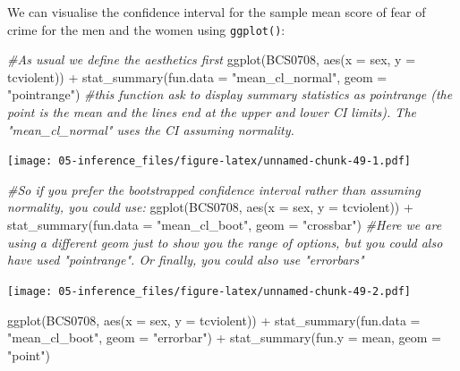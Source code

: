 \documentclass[
]{book}
\newenvironment{Shaded}{\begin{snugshade}}{\end{snugshade}}
\newcommand{\AttributeTok}[1]{\textcolor[rgb]{0.77,0.63,0.00}{#1}}
\newcommand{\CommentTok}[1]{\textcolor[rgb]{0.56,0.35,0.01}{\textit{#1}}}
\newcommand{\FunctionTok}[1]{\textcolor[rgb]{0.00,0.00,0.00}{#1}}
\newcommand{\NormalTok}[1]{#1}
\newcommand{\SpecialCharTok}[1]{\textcolor[rgb]{0.00,0.00,0.00}{#1}}
\newcommand{\StringTok}[1]{\textcolor[rgb]{0.31,0.60,0.02}{#1}}
\begin{document}
We can visualise the confidence interval for the sample mean score of fear of crime for the men and the women using \texttt{ggplot()}:

\begin{Shaded}
\begin{Highlighting}[]
\CommentTok{\#As usual we define the aesthetics first}
\FunctionTok{ggplot}\NormalTok{(BCS0708, }\FunctionTok{aes}\NormalTok{(}\AttributeTok{x =}\NormalTok{ sex, }\AttributeTok{y =}\NormalTok{ tcviolent)) }\SpecialCharTok{+}
        \FunctionTok{stat\_summary}\NormalTok{(}\AttributeTok{fun.data =} \StringTok{"mean\_cl\_normal"}\NormalTok{, }\AttributeTok{geom =} \StringTok{"pointrange"}\NormalTok{) }\CommentTok{\#this function ask to display summary statistics as pointrange (the point is the mean and the lines end at the upper and lower CI limits). The "mean\_cl\_normal" uses the CI assuming normality.}
\end{Highlighting}
\end{Shaded}

\texttt{[image: 05-inference\_files/figure-latex/unnamed-chunk-49-1.pdf]}

\begin{Shaded}
\begin{Highlighting}[]
\CommentTok{\#So if you prefer the bootstrapped confidence interval rather than assuming normality, you could use:}
\FunctionTok{ggplot}\NormalTok{(BCS0708, }\FunctionTok{aes}\NormalTok{(}\AttributeTok{x =}\NormalTok{ sex, }\AttributeTok{y =}\NormalTok{ tcviolent)) }\SpecialCharTok{+}
       \FunctionTok{stat\_summary}\NormalTok{(}\AttributeTok{fun.data =} \StringTok{"mean\_cl\_boot"}\NormalTok{, }\AttributeTok{geom =} \StringTok{"crossbar"}\NormalTok{) }\CommentTok{\#Here we are using a different geom just to show you the range of options, but you could also have used "pointrange". Or finally, you could also use "errorbars"}
\end{Highlighting}
\end{Shaded}

\texttt{[image: 05-inference\_files/figure-latex/unnamed-chunk-49-2.pdf]}

\begin{Shaded}
\begin{Highlighting}[]
\FunctionTok{ggplot}\NormalTok{(BCS0708, }\FunctionTok{aes}\NormalTok{(}\AttributeTok{x =}\NormalTok{ sex, }\AttributeTok{y =}\NormalTok{ tcviolent)) }\SpecialCharTok{+}
       \FunctionTok{stat\_summary}\NormalTok{(}\AttributeTok{fun.data =} \StringTok{"mean\_cl\_boot"}\NormalTok{, }\AttributeTok{geom =} \StringTok{"errorbar"}\NormalTok{) }\SpecialCharTok{+}
        \FunctionTok{stat\_summary}\NormalTok{(}\AttributeTok{fun.y =}\NormalTok{ mean, }\AttributeTok{geom =} \StringTok{"point"}\NormalTok{)}
\end{Highlighting}
\end{Shaded}
\end{document}
